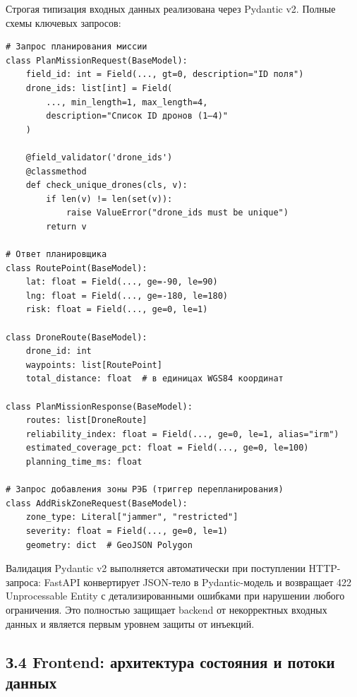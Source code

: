\documentclass[14pt,a4paper]{extarticle}
\begin{document}
Строгая типизация входных данных реализована через Pydantic v2. Полные схемы ключевых запросов:

\begin{verbatim}
# Запрос планирования миссии
class PlanMissionRequest(BaseModel):
    field_id: int = Field(..., gt=0, description="ID поля")
    drone_ids: list[int] = Field(
        ..., min_length=1, max_length=4,
        description="Список ID дронов (1–4)"
    )

    @field_validator('drone_ids')
    @classmethod
    def check_unique_drones(cls, v):
        if len(v) != len(set(v)):
            raise ValueError("drone_ids must be unique")
        return v

# Ответ планировщика
class RoutePoint(BaseModel):
    lat: float = Field(..., ge=-90, le=90)
    lng: float = Field(..., ge=-180, le=180)
    risk: float = Field(..., ge=0, le=1)

class DroneRoute(BaseModel):
    drone_id: int
    waypoints: list[RoutePoint]
    total_distance: float  # в единицах WGS84 координат

class PlanMissionResponse(BaseModel):
    routes: list[DroneRoute]
    reliability_index: float = Field(..., ge=0, le=1, alias="irm")
    estimated_coverage_pct: float = Field(..., ge=0, le=100)
    planning_time_ms: float

# Запрос добавления зоны РЭБ (триггер перепланирования)
class AddRiskZoneRequest(BaseModel):
    zone_type: Literal["jammer", "restricted"]
    severity: float = Field(..., ge=0, le=1)
    geometry: dict  # GeoJSON Polygon
\end{verbatim}

Валидация Pydantic v2 выполняется автоматически при поступлении HTTP-запроса: FastAPI конвертирует JSON-тело в Pydantic-модель и возвращает 422 Unprocessable Entity с детализированными ошибками при нарушении любого ограничения. Это полностью защищает backend от некорректных входных данных и является первым уровнем защиты от инъекций.

\hypertarget{ux437.4-frontend-ux430ux440ux445ux438ux442ux435ux43aux442ux443ux440ux430-ux441ux43eux441ux442ux43eux44fux43dux438ux44f-ux438-ux43fux43eux442ux43eux43aux438-ux434ux430ux43dux43dux44bux445}{%
\subsection{З.4 Frontend: архитектура состояния и потоки данных}\label{ux437.4-frontend-ux430ux440ux445ux438ux442ux435ux43aux442ux443ux440ux430-ux441ux43eux441ux442ux43eux44fux43dux438ux44f-ux438-ux43fux43eux442ux43eux43aux438-ux434ux430ux43dux43dux44bux445}}
\end{document}
